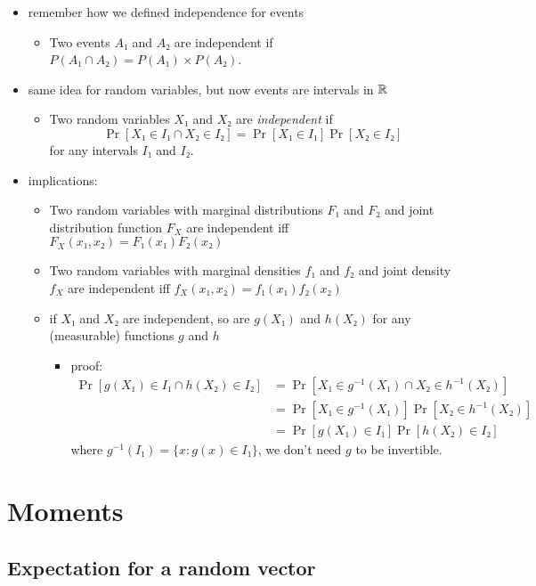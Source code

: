 \begin{itemize}
\item remember how we defined independence for events
\begin{itemize}
\item Two events $A₁$ and $A₂$ are independent if $P(A₁∩A₂) = P(A₁)×P(A₂)$.
\end{itemize}
\item same idea for random variables, but now events are intervals in $\mathbb{R}$
\begin{itemize}
\item Two random variables $X₁$ and $X₂$ are \emph{independent} if
  \[\Pr[X₁ ∈ I₁ ∩ X₂ ∈ I₂] = \Pr[X₁ ∈ I₁] \Pr[X₂ ∈ I₂]\] for any
  intervals $I₁$ and $I₂$.
\end{itemize}
\item implications:
\begin{itemize}
\item Two random variables with marginal distributions $F₁$ and
         $F₂$ and joint distribution function $F_X$ are independent iff
         $F_X(x₁, x₂) = F₁(x₁) F₂(x₂)$
\item Two random variables with marginal densities $f₁$ and $f₂$
         and joint density $f_X$ are independent iff 
         $f_X(x₁,x₂) = f₁(x₁) f₂(x₂)$
\item if $X₁$ and $X₂$ are independent, so are $g(X₁)$ and
         $h(X₂)$ for any (measurable) functions $g$ and $h$
\begin{itemize}
\item proof:
  \begin{align*}
    \Pr[g(X₁) ∈ I₁ ∩ h(X₂) ∈ I₂]
    &= \Pr[X₁ ∈ g^{-1}(X₁) ∩ X₂ ∈ h^{-1}(X₂)] \\
    &= \Pr[X₁ ∈ g^{-1}(X₁)] \Pr[X₂ ∈ h^{-1}(X₂)] \\
    &= \Pr[g(X₁) ∈ I₁] \Pr[h(X₂) ∈ I₂]
  \end{align*}
  where $g^{-1}(I₁) = \{x : g(x) ∈ I₁\}$, we don't need $g$ to be invertible.
\end{itemize}
\end{itemize}
\end{itemize}

\section{Moments}
\subsection{Expectation for a random vector}


